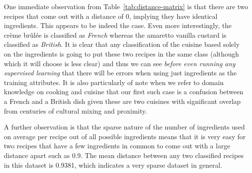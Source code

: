 \documentclass[11pt,a4paper]{article}
\begin{document}
One immediate observation from Table~\ref{tab:distance-matrix} is that there
are two recipes that come out with a distance of $0$, implying they have
identical ingredients. This appears to be indeed the case. Even more interestingly,
the cr\`eme br\^ul\'ee is classified as \emph{French} whereas the
amaretto vanilla custard is classified as \emph{British}. It is clear that any classification
of the cuisine based solely on the ingredients is going to put these two recipes in
the same class (although which it will choose is less clear) and thus we can see
\emph{before even running any supervised learning} that there will be errors when using
just ingredients as the training attributes. It is also particularly of note when
we refer to domain knowledge on
cooking and cuisine that our first such case is a confusion between a French and a British
dish given these are two cuisines with significant overlap from centuries of cultural mixing
and proximity.

A further observation is that the sparse nature of the number of ingredients used
on average per recipe out of all possible ingredients means that it is very easy for two
recipes that have a few ingredients in common to come out with a large distance apart such
as 0.9. The mean distance between any two classified recipes in this dataset is 0.9381, which
indicates a very sparse dataset in general.
\end{document}
